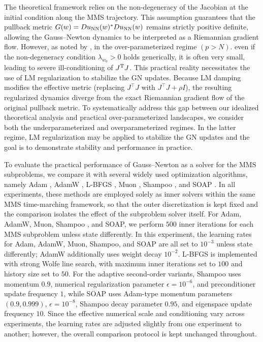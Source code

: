 \documentclass[twoside,11pt]{article}
\begin{document}
The theoretical framework relies on the non-degeneracy of the Jacobian at the initial condition along the MMS trajectory. This assumption guarantees that the pullback metric $G(w)=D u_{\rm NN}(w)^\ast D u_{\rm NN}(w)$ remains strictly positive definite, allowing the Gauss--Newton dynamics to be interpreted as a Riemannian gradient flow. However, as noted by \cite{cayci2025riemannian}, in the over-parameterized regime $(p>N)$. even if the non-degeneracy condition $\lambda_{w_0}>0$ holds generically, it is often very small, leading to severe ill-conditioning of $J^{\rm T} J$. This practical reality necessitates the use of LM regularization to stabilize the GN updates. Because LM damping modifies the effective metric (replacing $J^\top J$ with $J^\top J+\rho I$), the resulting regularized dynamics diverge from the exact Riemannian gradient flow of the original pullback metric. To systematically address this gap between our idealized theoretical analysis and practical over-parameterized landscapes, we consider both the underparameterized and overparameterized regimes. In the latter regime, LM regularization may be
applied to stabilize the GN updates and the goal is to demonstrate stability and performance in practice.


To evaluate the practical performance of Gauss--Newton as a solver for the MMS subproblems, we compare it with several widely used optimization algorithms, namely Adam \citep{kingma2014adam}, AdamW \citep{loshchilov2017decoupled}, L-BFGS \citep{nocedal2006numerical}, Muon \citep{jordan2024muon}, Shampoo \citep{gupta2018shampoo}, and SOAP \citep{vyas2024soap}. In all experiments, these methods are employed solely as inner solvers within the same MMS time-marching framework, so that the outer discretization is kept fixed and the comparison isolates the effect of the subproblem solver itself. For Adam, AdamW, Muon, Shampoo , and SOAP, we perform $500$ inner iterations for each MMS subproblem unless state differently. In this experiment, the learning rates for Adam, AdamW, Muon, Shampoo, and SOAP are all set to $10^{-3}$ unless state differently; AdamW additionally uses weight decay \(10^{-2}\). L-BFGS is implemented with strong Wolfe line search, with maximum inner iterations set to $100$ and history size set to $50$. For the adaptive second-order variants, Shampoo uses momentum $0.9$, numerical regularization parameter $\epsilon=10^{-6}$, and preconditioner update frequency $1$, while SOAP uses Adam-type momentum parameters $(0.9,0.999)$, $\epsilon=10^{-8}$, Shampoo decay parameter $0.95$, and eigenspace update frequency $10$. Since the effective numerical scale and conditioning vary across experiments, the learning rates are adjusted slightly from one experiment to another; however, the overall comparison protocol is kept unchanged throughout.
\end{document}
